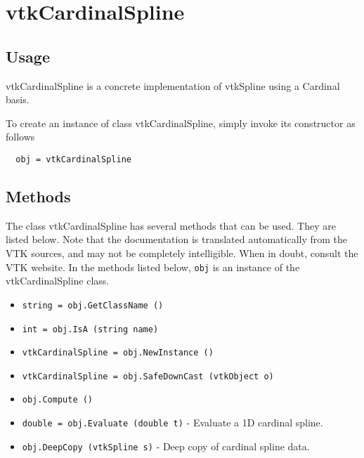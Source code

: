 \section{vtkCardinalSpline}

\subsection{Usage}

 vtkCardinalSpline is a concrete implementation of vtkSpline using a
 Cardinal basis.

To create an instance of class vtkCardinalSpline, simply
invoke its constructor as follows
\begin{verbatim}
  obj = vtkCardinalSpline
\end{verbatim}
\subsection{Methods}

The class vtkCardinalSpline has several methods that can be used.
  They are listed below.
Note that the documentation is translated automatically from the VTK sources,
and may not be completely intelligible.  When in doubt, consult the VTK website.
In the methods listed below, \verb|obj| is an instance of the vtkCardinalSpline class.
\begin{itemize}
\item  \verb|string = obj.GetClassName ()|

\item  \verb|int = obj.IsA (string name)|

\item  \verb|vtkCardinalSpline = obj.NewInstance ()|

\item  \verb|vtkCardinalSpline = obj.SafeDownCast (vtkObject o)|

\item  \verb|obj.Compute ()|

\item  \verb|double = obj.Evaluate (double t)| -  Evaluate a 1D cardinal spline.

\item  \verb|obj.DeepCopy (vtkSpline s)| -  Deep copy of cardinal spline data.

\end{itemize}
